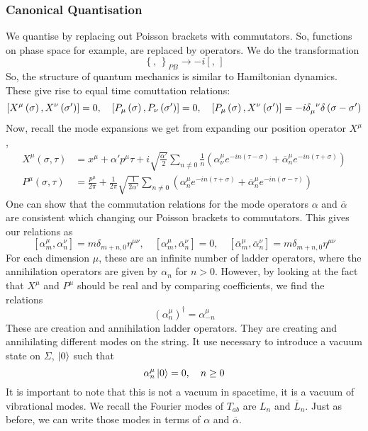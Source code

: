 \documentclass[11pt, oneside]{article}   	%
\theoremstyle{slanted}
\begin{document}
\subsubsection{Canonical Quantisation}
We quantise by 
replacing out Poisson brackets 
with commutators. So, functions on phase 
space for example, are replaced by operators. 
We do the transformation 
\[
 \left\{  , \,   \right\}  _{ P B  }  \to  - i \left[  , \,  \right] 
\] So, the structure 
of quantum mechanics is 
similar to Hamiltonian dynamics. 
These give rise to equal time comuttation 
relations: 
\[
	\left[  X ^ \mu \left( \sigma \right) , X ^ \nu \left( \sigma '  \right)    \right]   = 0 , \quad \left[  P _ \mu \left( \sigma  \right)  , 
	P _ \nu \left( \sigma '  \right)   \right]   = 0 , \quad 
	\left[  P _ \mu \left( \sigma  \right)  , 
	X ^ \nu \left(  \sigma '  \right)  \right]   =  - i \delta 
	\indices{ _ \mu ^ \nu  } \delta \left( \sigma - \sigma '  \right)   
\] Now, recall the mode 
expansions we get from expanding 
our position operator $ X ^ \mu $, 
\begin{align*}
	X ^ \mu \left( \sigma , \tau  \right)   &= 
 x ^ \mu +  \alpha' p ^ \mu \tau + i \sqrt{ \frac{ \alpha ' }{ 2 } }  
 \sum _{ n \neq 0   } \frac{1}{n } \left( \alpha _ \nu ^ \mu 
 e ^{  - i n \left( \tau  - \sigma  \right)  } + \overline{ \alpha } _ n ^ \mu 
  e^{  - i n \left( \tau + \sigma  \right) }\right) \\
  P ^ \mu \left( \sigma, \tau  \right)  &=  
  \frac{p ^ \mu }{ 2 \pi } + \frac{1}{2 \pi  } 
  \sqrt{ \frac{1}{2 \alpha  ' }  }  
  \sum _{ n \neq 0 } \left( \alpha _ n ^ \mu e ^{  - i n\left( \tau + \sigma  \right)  } 
  + \overline{ \alpha } ^ \mu _ n e ^{  - in \left( \sigma - \tau  \right)  } \right) 
\end{align*} One can show that the commutation 
relations for the mode operators $ \alpha $ and $ \overline{ \alpha }  $  are 
consistent which changing our Poisson brackets to 
commutators. This gives our relations as 
\[
 \left[  \alpha _ m ^ \mu , \alpha _ n ^ \nu  \right]   =
 m \delta _{ m + n , 0 } \eta ^{ \mu \nu } , \quad 
 \left[  \alpha _ m ^ \mu , \overline{ \alpha } _ n ^ \nu  \right]   = 0 , 
 \quad \left[  \overline{ \alpha }_ m ^ \mu , \overline{ \alpha } _ n ^ \nu  \right] 
  = m \delta_{ m +  n , 0 }\eta ^{ \mu \nu } 
\] For each 
dimension $ \mu $, these are an 
infinite number of ladder operators, where the annihilation  
operators are given by 
$ \alpha _ n $ for $ n > 0 $. However, by looking at the
fact that $  X ^ \mu $ and $ P ^ \mu $ should be real 
and by comparing coefficients, we find the relations 
\[
 \left( \alpha_ n ^ \mu  \right)  ^{ \dagger }  = \alpha _{  -n } ^ \mu 
\] These are 
creation and annihilation ladder 
operators. 
They are creating and annihilating 
different modes on the string. 
It use necessary to 
introduce a vacuum state on $ \Sigma $, 
$ \ket{ 0 } $ such that 
\[
 \alpha _ n ^ \mu \ket{ 0 }  = 0, \quad n \geq 0 
\] It is 
important to note that this is not a vacuum in spacetime, 
it is a vacuum of vibrational modes. 
We recall the 
Fourier modes of $ T _{ ab } $
are $ L _ n $ and $ \overline{ L } _ n $. 
Just as before, 
we can write those modes in terms of $ \alpha $ and $ \overline{ \alpha } $. 
\end{document}

